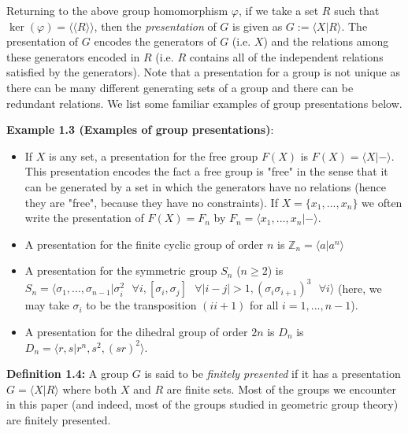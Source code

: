\documentclass[12pt]{article}
\newcommand{\vs}{\vskip10pt}
\begin{document}
	\vs
	
	Returning to the above group homomorphism $\varphi$, if we take a set $R$ such that $\ker(\varphi) = \langle \langle R \rangle \rangle$, then the \textit{presentation} of $G$ is given as $G := \langle X \vert R \rangle$. The presentation of $G$ encodes the generators of $G$ (i.e. $X$) and the relations among these generators encoded in $R$ (i.e. $R$ contains all of the independent relations satisfied by the generators). Note that a presentation for a group is not unique as there can be many different generating sets of a group and there can be redundant relations. We list some familiar examples of group presentations below.
	
	\vs 
	
	\textbf{Example 1.3 (Examples of group presentations)}: 
	
	\begin{itemize}
		\item If $X$ is any set, a presentation for the free group $F(X)$ is $F(X) = \langle X \vert - \rangle$. This presentation encodes the fact a free group is "free" in the sense that it can be generated by a set in which the generators have no relations (hence they are "free", because they have no constraints). If $X = \{x_1,...,x_n\} $ we often write the presentation of $F(X) = F_n$ by $F_n = \langle x_1,...,x_n \vert - \rangle$. 
		\item A presentation for the finite cyclic group of order $n$ is $\mathbb{Z}_n = \langle a \vert a^n \rangle$
		\item A presentation for the symmetric group $S_n$ ($n \geq 2$) is $S_n = \langle \sigma_1,...,\sigma_{n-1} \vert \sigma_i^2 \text{ } \forall i, [\sigma_i, \sigma_j] \text{ } \forall \vert i - j \vert > 1, (\sigma_i \sigma_{i+1})^3 \text{ } \forall i \rangle$ (here, we may take $\sigma_i$ to be the transposition $(i i+1)$ for all $i = 1,...,n-1$). 
		\item A presentation for the dihedral group of order $2n$ is $D_n$ is $D_n = \langle r,s \vert r^n, s^2, (sr)^2 \rangle$. 
	\end{itemize}

	\textbf{Definition 1.4: } A group $G$ is said to be \textit{finitely presented} if it has a presentation $G = \langle X \vert R \rangle$ where both $X$ and $R$ are finite sets. Most of the groups we encounter in this paper (and indeed, most of the groups studied in geometric group theory) are finitely presented. 
	
	\vs 
	
\end{document}
